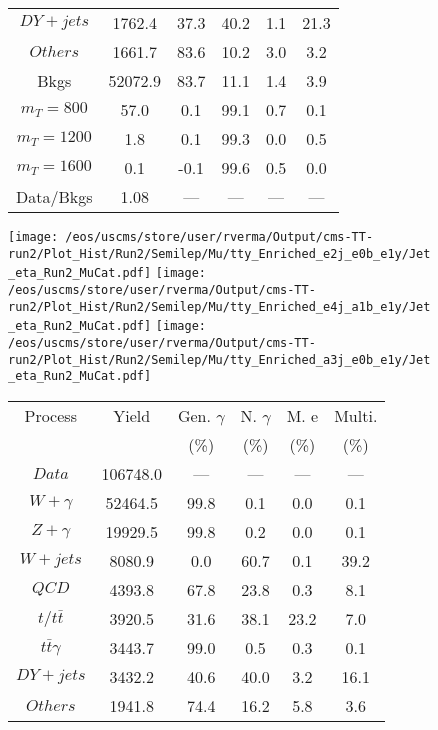 \begin{figure}
\begin{minipage}[c]{0.32\textwidth}
{\begin{tabular}{cccccc}
$ DY+jets $ &  1762.4 &  37.3 &  40.2 &  1.1 &  21.3\\
$ Others $ &  1661.7 &  83.6 &  10.2 &  3.0 &  3.2\\
Bkgs &  52072.9 &  83.7 &  11.1 &  1.4 &  3.9\\
$ m_{T} = 800 $ &  57.0 &  0.1 &  99.1 &  0.7 &  0.1\\
$ m_{T} = 1200 $ &  1.8 &  0.1 &  99.3 &  0.0 &  0.5\\
$ m_{T} = 1600 $ &  0.1 &  -0.1 &  99.6 &  0.5 &  0.0\\
Data/Bkgs &  1.08 &  --- &  --- &  --- &  ---\\
\hline
\end{tabular}
}
\end{minipage}
\end{figure}

\begin{figure}
\centering
\texttt{[image: /eos/uscms/store/user/rverma/Output/cms-TT-run2/Plot\_Hist/Run2/Semilep/Mu/tty\_Enriched\_e2j\_e0b\_e1y/Jet\_eta\_Run2\_MuCat.pdf]}
\texttt{[image: /eos/uscms/store/user/rverma/Output/cms-TT-run2/Plot\_Hist/Run2/Semilep/Mu/tty\_Enriched\_e4j\_a1b\_e1y/Jet\_eta\_Run2\_MuCat.pdf]}
\texttt{[image: /eos/uscms/store/user/rverma/Output/cms-TT-run2/Plot\_Hist/Run2/Semilep/Mu/tty\_Enriched\_a3j\_e0b\_e1y/Jet\_eta\_Run2\_MuCat.pdf]}
\begin{minipage}[c]{0.32\textwidth}
\centering
\tiny{
\begin{tabular}{cccccc}
\hline
Process & Yield & Gen. $\gamma$ & N. $\gamma$ & M. e & Multi. \\
 &  & (\%) & (\%) & (\%) & (\%)  \\
\hline
                                                                      $ Data $ &  106748.0 &  --- &  --- &  --- &  ---\\
$ W+\gamma $ &  52464.5 &  99.8 &  0.1 &  0.0 &  0.1\\
$ Z+\gamma $ &  19929.5 &  99.8 &  0.2 &  0.0 &  0.1\\
$ W+jets $ &  8080.9 &  0.0 &  60.7 &  0.1 &  39.2\\
$ QCD $ &  4393.8 &  67.8 &  23.8 &  0.3 &  8.1\\
$ t/t\bar{t} $ &  3920.5 &  31.6 &  38.1 &  23.2 &  7.0\\
$ t\bar{t}\gamma $ &  3443.7 &  99.0 &  0.5 &  0.3 &  0.1\\
$ DY+jets $ &  3432.2 &  40.6 &  40.0 &  3.2 &  16.1\\
$ Others $ &  1941.8 &  74.4 &  16.2 &  5.8 &  3.6\\

\end{tabular}}
\end{minipage}
\end{figure}
